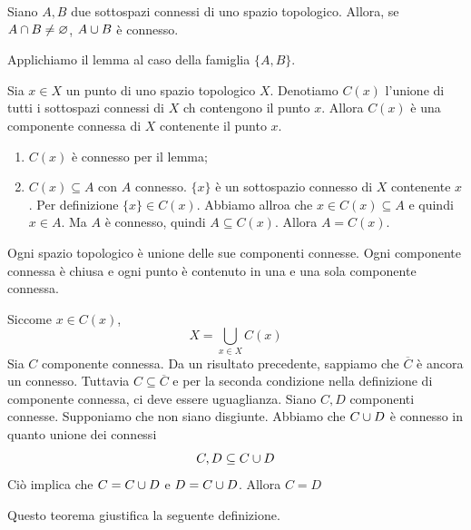 \documentclass[a4paper]{article}
\begin{document}
\begin{snippetcorollary}{}
    Siano \(A,B\) due sottospazi connessi di uno spazio topologico.
    Allora, se \(A \cap B \neq \varnothing\), \(A \cup B\) è connesso.
\end{snippetcorollary}

\begin{snippetproof}{}
    Applichiamo il lemma al caso della famiglia \(\{A,B\}\).
\end{snippetproof}

\begin{snippetlemma}{}
    Sia \(x \in X\) un punto di uno spazio topologico \(X\).
    Denotiamo \(C(x)\) l'unione di tutti i sottospazi connessi di \(X\)
    ch contengono il punto \(x\).
    Allora \(C(x)\) è una componente connessa di \(X\) contenente il punto \(x\).
\end{snippetlemma}

\begin{snippetproof}{}
    \begin{enumerate}
        \item \(C(x)\) è connesso per il lemma;
        \item \(C(x) \subseteq A\) con \(A\) connesso.
        \(\{x\}\) è un sottospazio connesso di \(X\) contenente \(x\).
        Per definizione \(\{x\} \in C(x)\).
        Abbiamo allroa che \(x \in C(x) \subseteq A\) e quindi \(x\in A\).
        Ma \(A\) è connesso, quindi \(A \subseteq C(x)\).
        Allora \(A = C(x)\).
    \end{enumerate}
\end{snippetproof}

\begin{snippettheorem}{}
    Ogni spazio topologico è unione delle sue componenti connesse.
    Ogni componente connessa è chiusa
    e ogni punto è contenuto in una e una sola componente connessa.
\end{snippettheorem}

\begin{snippetproof}{}
    Siccome \(x\in C(x)\),
    \[
        X = \bigcup_{x\in X} C(x)
    \]
    Sia \(C\) componente connessa. Da un risultato precedente,
    sappiamo che \(\overline{C}\) è ancora un connesso.
    Tuttavia \(C \subseteq \overline{C}\) e per la seconda condizione
    nella definizione di componente connessa, ci deve essere uguaglianza.
    Siano \(C,D\) componenti connesse.
    Supponiamo che non siano disgiunte.
    Abbiamo che \(C \cup D\) è connesso in quanto unione dei connessi
    \[C,D \subseteq C \cup D\]
    Ciò implica che \(C = C \cup D\) e \(D = C \cup D\).
    Allora \(C=D\)
\end{snippetproof}
Questo teorema giustifica la seguente definizione.
\end{document}
